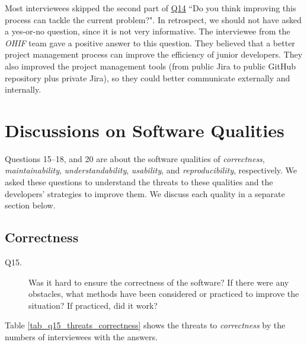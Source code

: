 Most interviewees skipped the second part of \hyperlink{q14}{Q14} ``Do you think improving this process can tackle the current problem?". In retrospect, we should not have asked a yes-or-no question, since it is not very informative. The interviewee from the \textit{OHIF} team gave a positive answer to this question. They believed that a better project management process can improve the efficiency of junior developers. They also improved the project management tools (from public Jira to public GitHub repository plus private Jira), so they could better communicate externally and internally.

\section{Discussions on Software Qualities}
\label{sec_interview_software_qualities}
Questions 15--18, and 20 are about the software qualities of \textit{correctness}, \textit{maintainability}, \textit{understandability}, \textit{usability}, and \textit{reproducibility}, respectively. We asked these questions to understand the threats to these qualities and the developers' strategies to improve them. We discuss each quality in a separate section below.

\subsection{Correctness}
\label{sec_interview_correctness}
\begin{description}
\item[Q15.] Was it hard to ensure the correctness of the software? If there were any obstacles, what methods have been considered or practiced to improve the situation? If practiced, did it work?
\end{description}

Table \ref{tab_q15_threats_correctness} shows the threats to \textit{correctness} by the numbers of interviewees with the answers.

